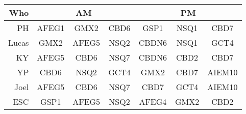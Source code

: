 





\renewcommand{\arraystretch}{2}
\begin{center}
\begin{tabular}{r|ccc|ccc|}
Who & \multicolumn{3}{|c|}{AM} & \multicolumn{3}{|c|}{PM}\\
\hline
PH & AFEG1 & GMX2 & CBD6 & GSP1 & NSQ1 & CBD7\\
Lucas & GMX2 & AFEG5 & NSQ2 & CBDN6 & NSQ1 & GCT4\\
KY & AFEG5 & CBD6 & NSQ7 & CBDN6 & CBD2 & CBD7\\
YP & CBD6 & NSQ2 & GCT4 & GMX2 & CBD7 & AIEM10\\
Joel & AFEG5 & CBD6 & NSQ7 & CBD7 & GCT4 & AIEM10\\
ESC & GSP1 & AFEG5 & NSQ2 & AFEG4 & GMX2 & CBD2\\
\end{tabular}
\end{center}

